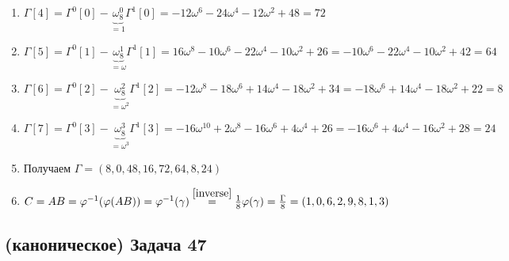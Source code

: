 \documentclass[a4paper]{article}
\begin{document}
\begin{enumerate}
\begin{enumerate}
\item $\Gamma[4]=\Gamma^0[0]-\underbrace{\omega_8^0}_{=1}\Gamma^1[0]=-12\omega^6-24\omega^4-12\omega^2+48=72$
\item $\Gamma[5]=\Gamma^0[1]-\underbrace{\omega_8^1}_{=\omega}\Gamma^1[1]=16\omega^8-10\omega^6-22\omega^4-10\omega^2+26=-10\omega^6-22\omega^4-10\omega^2+42=64$
\item $\Gamma[6]=\Gamma^0[2]-\underbrace{\omega_8^2}_{=\omega^2}\Gamma^1[2]=-12\omega^8-18\omega^6+14\omega^4-18\omega^2+34=-18\omega^6+14\omega^4-18\omega^2+22=8$
\item $\Gamma[7]=\Gamma^0[3]-\underbrace{\omega_8^3}_{=\omega^3}\Gamma^1[3]=-16\omega^{10}+2\omega^8-16\omega^6+4\omega^4+26=-16\omega^6+4\omega^4-16\omega^2+28=24$
\item Получаем $\Gamma=(8,0,48,16,72,64,8,24)$
\item $C=AB=\varphi^{-1}(\varphi(AB))=\varphi^{-1}(\gamma)\overset{\ref{inverse}}{=}\frac{1}{8}\varphi(\gamma)=\frac{\Gamma}{8}=(1,0,6,2,9,8,1,3)$
\end{enumerate}
\end{enumerate}
\subsection*{(каноническое) Задача 47}
\end{document}

